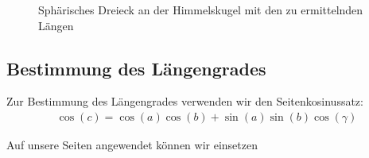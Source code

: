 \begin{refsection}
\begin{figure}[!htb]
\centering
\quad \quad
\centering
\quad \quad
\centering
\quad \quad
\centering
\caption{Sphärisches Dreieck an der Himmelskugel mit den zu ermittelnden Längen} 
\end{figure}


\subsection{Bestimmung des Längengrades} \label{BestimmungL} 
Zur Bestimmung des Längengrades verwenden wir den Seitenkosinussatz:
\begin{align*}
\cos(c) = \cos(a)\cos(b) + \sin(a)\sin(b)\cos(\gamma)
\end{align*}

Auf unsere Seiten angewendet können wir einsetzen


\end{refsection}
